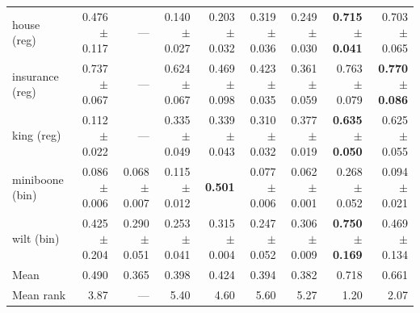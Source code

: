 \begin{tabular}{lrrrrrrrr}
house (reg) & 0.476$\pm$0.117 & --- & 0.140$\pm$0.027 & 0.203$\pm$0.032 & 0.319$\pm$0.036 & 0.249$\pm$0.030 & \textbf{0.715$\pm$0.041} & 0.703$\pm$0.065 \\
insurance (reg) & 0.737$\pm$0.067 & --- & 0.624$\pm$0.067 & 0.469$\pm$0.098 & 0.423$\pm$0.035 & 0.361$\pm$0.059 & 0.763$\pm$0.079 & \textbf{0.770$\pm$0.086} \\
king (reg) & 0.112$\pm$0.022 & --- & 0.335$\pm$0.049 & 0.339$\pm$0.043 & 0.310$\pm$0.032 & 0.377$\pm$0.019 & \textbf{0.635$\pm$0.050} & 0.625$\pm$0.055 \\
miniboone (bin) & 0.086$\pm$0.006 & 0.068$\pm$0.007 & 0.115$\pm$0.012 & \textbf{0.501} & 0.077$\pm$0.006 & 0.062$\pm$0.001 & 0.268$\pm$0.052 & 0.094$\pm$0.021 \\
wilt (bin) & 0.425$\pm$0.204 & 0.290$\pm$0.051 & 0.253$\pm$0.041 & 0.315$\pm$0.004 & 0.247$\pm$0.052 & 0.306$\pm$0.009 & \textbf{0.750$\pm$0.169} & 0.469$\pm$0.134 \\
\midrule
Mean & 0.490 & 0.365 & 0.398 & 0.424 & 0.394 & 0.382 & 0.718 & 0.661 \\
Mean rank & 3.87 & --- & 5.40 & 4.60 & 5.60 & 5.27 & 1.20 & 2.07 \\
\bottomrule
\end{tabular}
\endgroup
